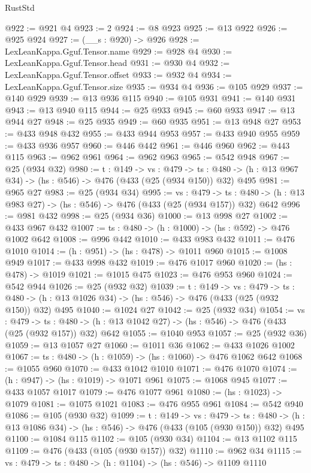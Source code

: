 \begin{lexlean}{RustStd}
\begin{coremodule}
@922 := @921 @4
@923 := 2
@924 := @8 @923
@925 := @13 @922
@926 := @925 @924
@927 := (__s : @920) -> @926
@928 := LexLeanKappa.Gguf.Tensor.name
@929 := @928 @4
@930 := LexLeanKappa.Gguf.Tensor.head
@931 := @930 @4
@932 := LexLeanKappa.Gguf.Tensor.offset
@933 := @932 @4
@934 := LexLeanKappa.Gguf.Tensor.size
@935 := @934 @4
@936 := @105 @929
@937 := @140 @929
@939 := @13 @936 @115
@940 := @105 @931
@941 := @140 @931
@943 := @13 @940 @115
@944 := @25 @933
@945 := @60 @933
@947 := @13 @944 @27
@948 := @25 @935
@949 := @60 @935
@951 := @13 @948 @27
@953 := @433 @948 @432
@955 := @433 @944 @953
@957 := @433 @940 @955
@959 := @433 @936 @957
@960 := @446 @442
@961 := @446 @960
@962 := @443 @115
@963 := @962 @961
@964 := @962 @963
@965 := @542 @948
@967 := @25 (@934 @32)
@980 := {t : @149} ->
  {vs : @479} ->
  {ts : @480} -> (h : @13 @967 @34) -> (hs : @546) -> @476 (@433 (@25 (@934 @150)) @32) @495
@981 := @965 @27
@983 := @25 (@934 @34)
@995 := {vs : @479} ->
  {ts : @480} -> (h : @13 @983 @27) -> (hs : @546) -> @476 (@433 (@25 (@934 @157)) @32) @642
@996 := @981 @432
@998 := @25 (@934 @36)
@1000 := @13 @998 @27
@1002 := @433 @967 @432
@1007 := {ts : @480} -> (h : @1000) -> (hs : @592) -> @476 @1002 @642
@1008 := @996 @442
@1010 := @433 @983 @432
@1011 := @476 @1010
@1014 := (h : @951) -> (hs : @478) -> @1011 @960
@1015 := @1008 @949
@1017 := @433 @998 @432
@1019 := @476 @1017 @960
@1020 := (hs : @478) -> @1019
@1021 := @1015 @475
@1023 := @476 @953 @960
@1024 := @542 @944
@1026 := @25 (@932 @32)
@1039 := {t : @149} ->
  {vs : @479} ->
  {ts : @480} -> (h : @13 @1026 @34) -> (hs : @546) -> @476 (@433 (@25 (@932 @150)) @32) @495
@1040 := @1024 @27
@1042 := @25 (@932 @34)
@1054 := {vs : @479} ->
  {ts : @480} -> (h : @13 @1042 @27) -> (hs : @546) -> @476 (@433 (@25 (@932 @157)) @32) @642
@1055 := @1040 @953
@1057 := @25 (@932 @36)
@1059 := @13 @1057 @27
@1060 := @1011 @36
@1062 := @433 @1026 @1002
@1067 := {ts : @480} -> (h : @1059) -> (hs : @1060) -> @476 @1062 @642
@1068 := @1055 @960
@1070 := @433 @1042 @1010
@1071 := @476 @1070
@1074 := (h : @947) -> (hs : @1019) -> @1071 @961
@1075 := @1068 @945
@1077 := @433 @1057 @1017
@1079 := @476 @1077 @961
@1080 := (hs : @1023) -> @1079
@1081 := @1075 @1021
@1083 := @476 @955 @961
@1084 := @542 @940
@1086 := @105 (@930 @32)
@1099 := {t : @149} ->
  {vs : @479} ->
  {ts : @480} -> (h : @13 @1086 @34) -> (hs : @546) -> @476 (@433 (@105 (@930 @150)) @32) @495
@1100 := @1084 @115
@1102 := @105 (@930 @34)
@1104 := @13 @1102 @115
@1109 := @476 (@433 (@105 (@930 @157)) @32)
@1110 := @962 @34
@1115 := {vs : @479} -> {ts : @480} -> (h : @1104) -> (hs : @546) -> @1109 @1110

\end{coremodule}
\end{lexlean}
